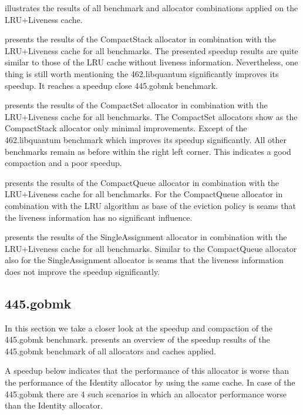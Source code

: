\documentclass[onecolumn, openright, master, english, signatures]{dbrgrptt}
\begin{document}
 illustrates the results of all benchmark and allocator combinations applied on the \ac{LRU}+Liveness cache.

 presents the results of the CompactStack allocator in combination with the \ac{LRU}+Liveness cache for all benchmarks. The presented speedup results are quite similar to those of the \ac{LRU} cache without liveness information. Nevertheless, one thing is still worth mentioning the 462.libquantum significantly improves its speedup. It reaches a speedup close 445.gobmk benchmark.

 presents the results of the CompactSet allocator in combination with the \ac{LRU}+Liveness cache for all benchmarks. The CompactSet allocators show as the CompactStack allocator only minimal improvements. Except of the 462.libquantum benchmark which improves its speedup significantly. All other benchmarks remain as before within the right left corner. This indicates a good compaction and a poor speedup.

 presents the results of the CompactQueue allocator in combination with the \ac{LRU}+Liveness cache for all benchmarks. For the CompactQueue allocator in combination with the \ac{LRU} algorithm as base of the eviction policy is seams that the liveness information has no significant influence.

 presents the results of the SingleAssignment allocator in combination with the \ac{LRU}+Liveness cache for all benchmarks. Similar to the CompactQueue allocator also for the SingleAssignment allocator is seams that the liveness information does not improve the speedup significantly.

\subsection{445.gobmk}

In this section we take a closer look at the speedup and compaction of the 445.gobmk benchmark.  presents an overview of the speedup results of the 445.gobmk benchmark of all allocators and caches applied.

A speedup below indicates that the performance of this allocator is worse than the performance of the Identity allocator by using the same cache. In case of the 445.gobmk there are 4 such scenarios in which an allocator performance worse than the Identity allocator.
\end{document}
